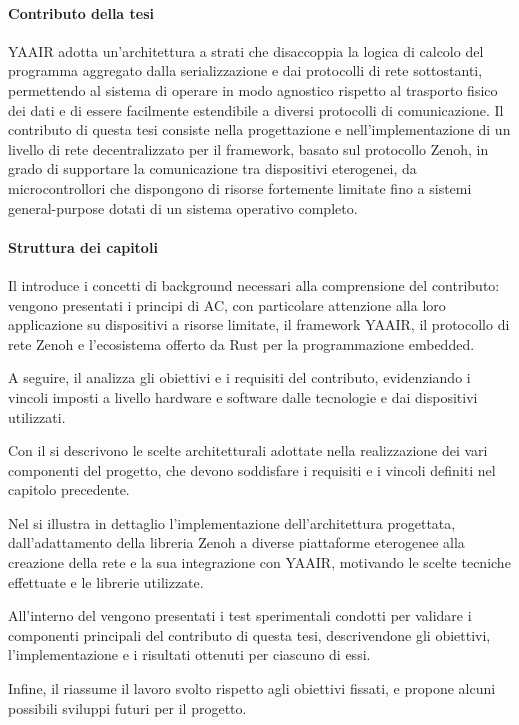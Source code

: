 \paragraph{Contributo della tesi}
\label{sec:contribution}
\ac{YAAIR} adotta un'architettura a strati che disaccoppia la logica di calcolo
del programma aggregato dalla serializzazione e dai protocolli di rete sottostanti,
permettendo al sistema di operare in modo agnostico rispetto al trasporto fisico
dei dati e di essere facilmente estendibile a diversi protocolli di comunicazione.
Il contributo di questa tesi consiste nella progettazione e nell'implementazione
di un livello di rete decentralizzato per il framework, basato sul protocollo Zenoh,
in grado di supportare la comunicazione tra dispositivi eterogenei, da microcontrollori
che dispongono di risorse fortemente limitate fino a sistemi general-purpose
dotati di un sistema operativo completo.

\paragraph{Struttura dei capitoli}
\label{sec:thesis-structure}
Il  introduce i concetti di background
necessari alla comprensione del contributo: vengono presentati i principi di \ac{AC},
con particolare attenzione alla loro applicazione su dispositivi a risorse
limitate, il framework \ac{YAAIR}, il protocollo di rete Zenoh e l'ecosistema offerto
da Rust per la programmazione embedded.

A seguire, il  analizza gli obiettivi e
i requisiti del contributo, evidenziando i vincoli imposti a livello hardware e
software dalle tecnologie e dai dispositivi utilizzati.

Con il  si descrivono le scelte
architetturali adottate nella realizzazione dei vari componenti del progetto,
che devono soddisfare i requisiti e i vincoli definiti nel capitolo precedente.

Nel  si illustra in dettaglio
l'implementazione dell'architettura progettata, dall'adattamento della libreria Zenoh
a diverse piattaforme eterogenee alla creazione della rete e la sua integrazione
con \ac{YAAIR}, motivando le scelte tecniche effettuate e le librerie utilizzate.

All'interno del 
vengono presentati i test sperimentali condotti per validare i componenti
principali del contributo di questa tesi, descrivendone gli obiettivi, l'implementazione
e i risultati ottenuti per ciascuno di essi.

Infine, il  riassume il lavoro
svolto rispetto agli obiettivi fissati, e propone alcuni possibili sviluppi futuri
per il progetto.
